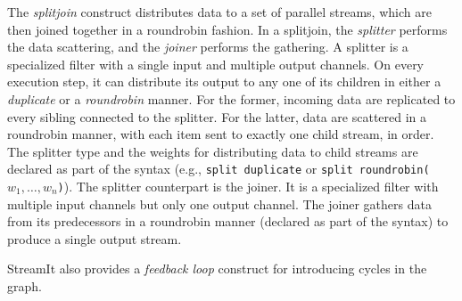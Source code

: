 \documentclass{sigplanconf}
\begin{document}
The {\it splitjoin} construct distributes data to a set of parallel
streams, which are then joined together in a roundrobin fashion.  In
a splitjoin, the {\it splitter} performs the data scattering, and the
{\it joiner} performs the gathering. A splitter is a specialized
filter with a single input and  multiple output channels. On 
every execution step, it can distribute its output to any one of
its children in either a {\it duplicate} or a {\it roundrobin}
manner. For the former, incoming data are replicated to every
sibling connected to the splitter. For the latter, data are scattered
in a roundrobin manner, with each item sent to exactly one child
stream, in order.  The splitter type and the weights for distributing data to
child streams are declared as part of the syntax (e.g., \texttt{split
duplicate} or \texttt{split roundrobin($w_1,\ldots,w_n$)}). The
splitter counterpart is the joiner. It is a specialized filter with  
multiple input channels but only one output channel. The joiner
gathers data from its predecessors in a roundrobin manner (declared
as part of the syntax) to produce a single output stream.

StreamIt also provides a {\it feedback loop} construct for introducing
cycles in the graph.


\end{document}
